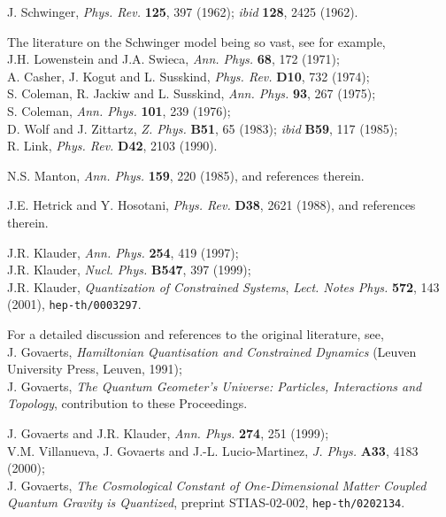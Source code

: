 \documentclass[a4paper,11pt]{article}
\begin{document}
\begin{thebibliography}{99}

J. Schwinger, {\em Phys. Rev.\/} {\bf 125}, 397 (1962);
{\it ibid} {\bf 128}, 2425 (1962).

 The literature on the Schwinger model being so vast,
see for example,\\
J.H. Lowenstein and J.A. Swieca, {\em Ann. Phys.\/} {\bf 68}, 172 (1971);\\
A. Casher, J. Kogut and L. Susskind, {\em Phys. Rev.\/} {\bf D10}, 732 (1974);\\
S. Coleman, R. Jackiw and L. Susskind, {\em Ann. Phys.\/} 
{\bf 93}, 267 (1975);\\
S. Coleman, {\em Ann. Phys.\/} {\bf 101}, 239 (1976);\\
D. Wolf and J. Zittartz, {\em Z. Phys.\/} {\bf B51}, 65 (1983); {\it ibid}
{\bf B59}, 117 (1985);\\
R. Link, {\em Phys. Rev.\/} {\bf D42}, 2103 (1990).

N.S. Manton, {\em Ann. Phys.\/} {\bf 159}, 220 (1985), and references therein.

J.E. Hetrick and Y. Hosotani, {\em Phys. Rev.\/} {\bf D38}, 
2621 (1988), and re\-fe\-ren\-ces therein.

J.R. Klauder, {\em Ann. Phys.\/} {\bf 254}, 419 (1997);\\
J.R. Klauder, {\em Nucl. Phys.\/} {\bf B547}, 397 (1999);\\
J.R. Klauder, {\sl Quantization of Constrained Systems\/},
{\sl Lect. Notes Phys.\/} {\bf 572}, 143 (2001), {\tt hep-th/0003297}.

For a detailed discussion and references to the original literature, see,\\
J. Govaerts, {\sl Hamiltonian Quantisation and Constrained Dynamics\/}
(Leuven University Press, Leuven, 1991);\\
J. Govaerts, {\sl The Quantum Geometer's Universe: Particles, Interactions and
Topology\/}, contribution to these Proceedings.

J. Govaerts and J.R. Klauder, {\em Ann. Phys.\/} {\bf 274}, 251 (1999);\\
V.M. Villanueva, J. Govaerts and J.-L. Lucio-Martinez, {\em J. Phys.\/}
{\bf A33}, 4183 (2000);\\
 J. Govaerts, {\sl The Cosmological Constant of One-Dimensional
Matter Coupled Quantum Gravity is Quantized\/},
preprint STIAS-02-002, {\tt hep-th/0202134}.


\end{thebibliography}
\end{document}
